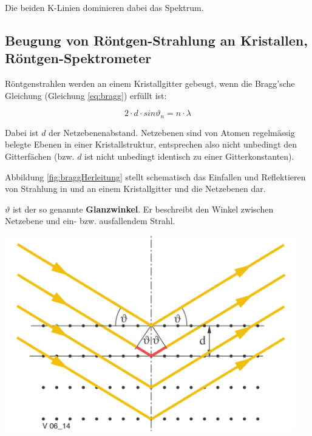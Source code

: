 Die beiden K-Linien dominieren dabei das Spektrum.


\subsection[Beugung von R\"ontgen-Strahlung an Kristallen]{Beugung von R\"ontgen-Strahlung an Kristallen, R\"ontgen-Spektrometer}
\label{subsec:rontgenBeugung}


\begin{minipage}[c][][b]{0.585\textwidth}
    R\"ontgenstrahlen  werden  an  einem   Kristallgitter  gebeugt,  wenn  die
    Bragg'sche Gleichung (Gleichung \ref{eq:bragg}) erf\"ullt ist:

    \begin{equation}
        \label{eq:bragg}
        2 \cdot d \cdot sin \vartheta_n = n \cdot \lambda
    \end{equation}

    Dabei   ist  $d$   der  Netzebenenabstand. Netzebenen   sind  von   Atomen
    regelm\"assig belegte  Ebenen in einer Kristallstruktur,  entsprechen also
    nicht unbedingt den Gitterf\"achen (bzw. $d$ ist nicht unbedingt identisch
    zu einer Gitterkonstanten).

    Abbildung \ref{fig:braggHerleitung}  stellt schematisch das  Einfallen und
    Reflektieren  von  Strahlung  in  und  an  einem  Kristallgitter  und  die
    Netzebenen dar.

    $\vartheta$ ist  der so  genannte \textbf{Glanzwinkel}. Er  beschreibt den
    Winkel zwischen Netzebene und ein- bzw. ausfallendem Strahl.

\end{minipage}
\begin{minipage}[c][][b]{0.4\textwidth}
    \centering
    \includegraphics[width=0.95\textwidth]{images/bragg-herleitung.png}
    \label{fig:braggHerleitung}
\end{minipage}

